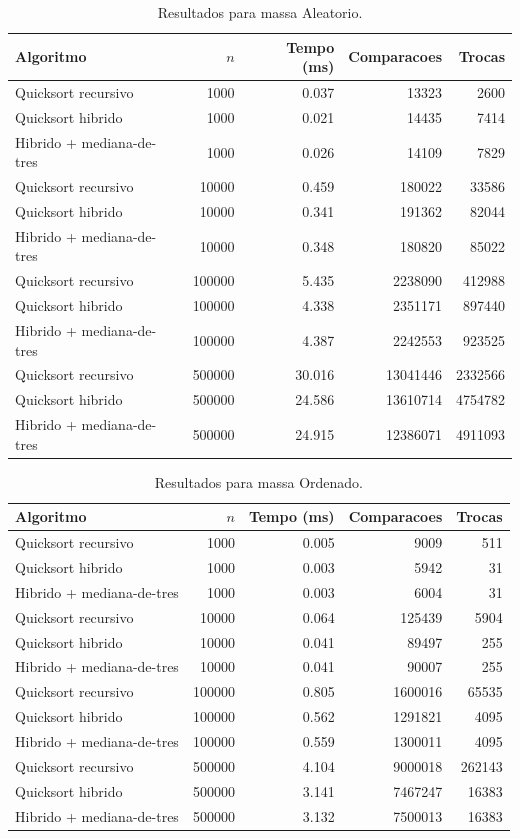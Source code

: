 
\begin{table}[H]
\centering
\caption{Resultados para massa Aleatorio.}
\label{tab:aleatorio}
\begin{tabular}{lrrrr}
\hline
Algoritmo & $n$ & Tempo (ms) & Comparacoes & Trocas \\
\hline
Quicksort recursivo & 1000 & 0.037 & 13323 & 2600 \\
Quicksort hibrido & 1000 & 0.021 & 14435 & 7414 \\
Hibrido + mediana-de-tres & 1000 & 0.026 & 14109 & 7829 \\
Quicksort recursivo & 10000 & 0.459 & 180022 & 33586 \\
Quicksort hibrido & 10000 & 0.341 & 191362 & 82044 \\
Hibrido + mediana-de-tres & 10000 & 0.348 & 180820 & 85022 \\
Quicksort recursivo & 100000 & 5.435 & 2238090 & 412988 \\
Quicksort hibrido & 100000 & 4.338 & 2351171 & 897440 \\
Hibrido + mediana-de-tres & 100000 & 4.387 & 2242553 & 923525 \\
Quicksort recursivo & 500000 & 30.016 & 13041446 & 2332566 \\
Quicksort hibrido & 500000 & 24.586 & 13610714 & 4754782 \\
Hibrido + mediana-de-tres & 500000 & 24.915 & 12386071 & 4911093 \\
\hline
\end{tabular}
\end{table}

\begin{table}[H]
\centering
\caption{Resultados para massa Ordenado.}
\label{tab:ordenado}
\begin{tabular}{lrrrr}
\hline
Algoritmo & $n$ & Tempo (ms) & Comparacoes & Trocas \\
\hline
Quicksort recursivo & 1000 & 0.005 & 9009 & 511 \\
Quicksort hibrido & 1000 & 0.003 & 5942 & 31 \\
Hibrido + mediana-de-tres & 1000 & 0.003 & 6004 & 31 \\
Quicksort recursivo & 10000 & 0.064 & 125439 & 5904 \\
Quicksort hibrido & 10000 & 0.041 & 89497 & 255 \\
Hibrido + mediana-de-tres & 10000 & 0.041 & 90007 & 255 \\
Quicksort recursivo & 100000 & 0.805 & 1600016 & 65535 \\
Quicksort hibrido & 100000 & 0.562 & 1291821 & 4095 \\
Hibrido + mediana-de-tres & 100000 & 0.559 & 1300011 & 4095 \\
Quicksort recursivo & 500000 & 4.104 & 9000018 & 262143 \\
Quicksort hibrido & 500000 & 3.141 & 7467247 & 16383 \\
Hibrido + mediana-de-tres & 500000 & 3.132 & 7500013 & 16383 \\
\hline
\end{tabular}
\end{table}


